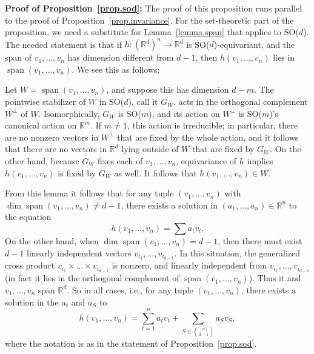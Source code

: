 \documentclass{article}
\renewcommand{\paragraph}[1]{\par\textbf{#1}}
\theoremstyle{Hogg}
\begin{document}
\paragraph{Proof of Proposition~\ref{prop.sod}:}
The proof of this proposition runs parallel to the proof of Proposition~\ref{prop.invariance}. For the set-theoretic part of the proposition, we need a substitute for Lemma~\ref{lemma.span} that applies to SO($d$). The needed statement is that if $h:(\mathbb R^d)^n\rightarrow \mathbb R^d$ is SO($d$)-equivariant, and the span of $v_1,\dots,v_n$ has dimension different from $d-1$, then $h(v_1,\dots,v_n)$ lies in $\operatorname{span}(v_1,\dots,v_n)$. We see this as follows:

Let $W=\operatorname{span}(v_1,\dots,v_n)$, and suppose this has dimension $d-m$. The pointwise stabilizer of $W$ in SO($d$), call it $G_W$, acts in the orthogonal complement $W^\perp$ of $W$. Isomorphically, $G_W$ is SO($m$), and its action on $W^\perp$ is SO($m$)'s canonical action on $\mathbb R^m$. If $m\neq 1$, this action is irreducible; in particular, there are no nonzero vectors in $W^\perp$ that are fixed by the whole action, and it follows that there are no vectors in $\mathbb R^d$ lying outside of $W$ that are fixed by $G_W$. On the other hand, because $G_W$ fixes each of $v_1,\dots,v_n$, equivariance of $h$ implies $h(v_1,\dots,v_n)$ is fixed by $G_W$ as well. It follows that $h(v_1,\dots,v_n)\in W$.

From this lemma it follows that for any tuple $(v_1,\dots,v_n)$ with $\dim \operatorname{span}(v_1,\dots,v_n) \neq d-1$, there exists a solution in $(a_1,\dots,a_n)\in\mathbb R^n$ to the equation
\begin{equation}
h(v_1,\dots,v_n) = \sum a_tv_t.
\end{equation}
On the other hand, when $\dim \operatorname{span}(v_1,\dots,v_n) = d-1$, then there must exist $d-1$ linearly independent vectors $v_{i_1},\dots,v_{i_{d-1}}$. In this situation, the generalized cross product $v_{i_1}\times\dots\times v_{i_{d-1}}$ is nonzero, and linearly independent from $v_{i_1},\dots,v_{i_{d-1}}$ (in fact it lies in the orthogonal complement of $\operatorname{span}(v_1,\dots,v_n)$). Thus it and $v_1,\dots,v_n$ span $\mathbb R^d$. So in all cases, i.e., for any tuple $(v_1,\dots,v_n)$, there exists a solution in the $a_t$ and $a_S$ to
\begin{equation}
h(v_1,\dots,v_n) = \sum_{t=1}^n a_tv_t + \sum_{S\in \binom{[n]}{d-1}}a_Sv_S,
\end{equation}
where the notation is as in the statement of Proposition~\ref{prop.sod}.
\end{document}

